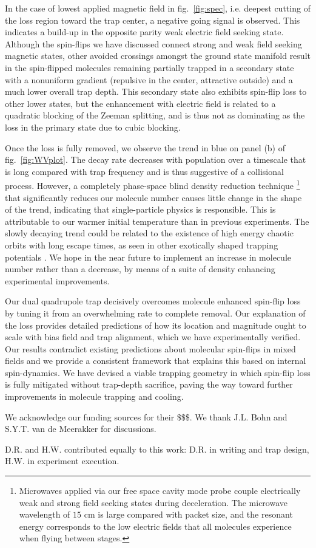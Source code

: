 \documentclass[%
 reprint,
 amsmath,amssymb,
 aps,
prl,
]{revtex4-1}
\begin{document}
In the case of lowest applied magnetic field in fig.~\ref{fig:spec}, i.e. deepest cutting of the loss region toward the trap center, a negative going signal is observed. This indicates a build-up in the opposite parity weak electric field seeking state. Although the spin-flips we have discussed connect strong and weak field seeking magnetic states, other avoided crossings amongst the ground state manifold result in the spin-flipped molecules remaining partially trapped in a secondary state with a nonuniform gradient (repulsive in the center, attractive outside) and a much lower overall trap depth. This secondary state also exhibits spin-flip loss to other lower states, but the enhancement with electric field is related to a quadratic blocking of the Zeeman splitting, and is thus not as dominating as the loss in the primary state due to cubic blocking.

Once the loss is fully removed, we observe the trend in blue on panel (b) of fig.~\ref{fig:WVplot}. The decay rate decreases with population over a timescale that is long compared with trap frequency and is thus suggestive of a collisional process. However, a completely phase-space blind density reduction technique \footnote{Microwaves applied via our free space cavity mode probe couple electrically weak and strong field seeking states during deceleration. The microwave wavelength of $15\text{ cm}$ is large compared with packet size, and the resonant energy corresponds to the low electric fields that all molecules experience when flying between stages.} that significantly reduces our molecule number causes little change in the shape of the trend, indicating that single-particle physics is responsible. This is attributable to our warmer initial temperature than in previous experiments. The slowly decaying trend could be related to the existence of high energy chaotic orbits with long escape times, as seen in other exotically shaped trapping potentials \cite{Gonzalez-Ferez2014}. We hope in the near future to implement an increase in molecule number rather than a decrease, by means of a suite of density enhancing experimental improvements.

Our dual quadrupole trap decisively overcomes molecule enhanced spin-flip loss by tuning it from an overwhelming rate to complete removal. Our explanation of the loss provides detailed predictions of how its location and magnitude ought to scale with bias field and trap alignment, which we have experimentally verified. Our results contradict existing predictions about molecular spin-flips in mixed fields and we provide a consistent framework that explains this based on internal spin-dynamics. We have devised a viable trapping geometry in which spin-flip loss is fully mitigated without trap-depth sacrifice, paving the way toward further improvements in molecule trapping and cooling.

We acknowledge our funding sources for their \$\$\$. We thank J.L. Bohn and S.Y.T. van de Meerakker for discussions.

D.R. and H.W. contributed equally to this work: D.R. in writing and trap design, H.W. in experiment execution.

\nocite{*}

\end{document}
